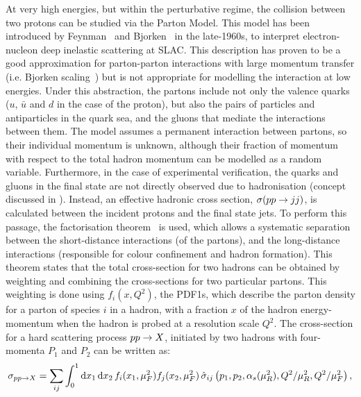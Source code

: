 At very high energies, but within the perturbative regime, the collision between two protons can be studied via the Parton Model. This model has been introduced by Feynman~\cite{Feynman-1969} and Bjorken~\cite{Bjorken-1969_1} in the late-1960s, to interpret electron-nucleon deep inelastic scattering at SLAC. This description has proven to be a good approximation for parton-parton interactions with large momentum transfer (i.e. Bjorken scaling~\cite{Bjorken-1969_2}) but is not appropriate for modelling the interaction at low energies.
Under this abstraction, the partons include not only the valence quarks (\(u\), \(\bar{u}\) and \(d\) in the case of the proton), but also the pairs of particles and antiparticles in the quark sea, and the gluons that mediate the interactions between them. The model assumes a permanent interaction between partons, so their individual momentum is unknown, although their fraction of momentum with respect to the total hadron momentum can be modelled as a random variable.
Furthermore, in the case of experimental verification, the quarks and gluons in the final state are not directly observed due to hadronisation (concept discussed in \Sect{\ref{subsec:theory:mc_simulation:hadronisation}}). Instead, an effective hadronic cross section, \(\sigma(pp\rightarrow jj)\), is calculated between the incident protons and the final state jets. To perform this passage, the factorisation theorem~\cite{Ellis_Georgi_Politzer_Ross-1978,Feynman-1969,Collins_Soper_Sterman-book,Collins_Soper-1987} is used, which allows a systematic separation between the short-distance interactions (of the partons), and the long-distance interactions (responsible for colour confinement and hadron formation). This theorem states that the total cross-section for two hadrons can be obtained by weighting and combining the cross-sections for two particular partons. This weighting is done using \(f_i(x,Q^2)\), the \acp{PDF1}, which describe the parton density for a parton of species \(i\) in a hadron, with a fraction \(x\) of the hadron energy-momentum when the hadron is probed at a resolution scale \(Q^2\). The cross-section for a hard scattering process \(pp \rightarrow X\), initiated by two hadrons with four-momenta \(P_1\) and \(P_2\) can be written as:
\begin{equation}
    \label{eq:theory:sm:hadron_interactions:xs}
    \sigma_{pp\rightarrow X} = \sum_{ij} \int_0^1 \dd{x_1} \dd{x_2} f_i(x_1, \mu_F^2) f_j(x_2, \mu_F^2) \, \hat{\sigma}_{ij}\left(p_1, p_2, \alpha_s(\mu_R^2), Q^2/\mu_R^2, Q^2/\mu_F^2 \right),
\end{equation}
